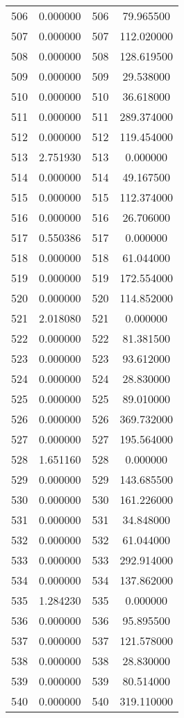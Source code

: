 \documentclass[12pt]{article}
\begin{document}
\begin{longtable}{@{}cccc@{}}
506 & 0.000000 & 506 & 79.965500 \\
507 & 0.000000 & 507 & 112.020000 \\
508 & 0.000000 & 508 & 128.619500 \\
509 & 0.000000 & 509 & 29.538000 \\
510 & 0.000000 & 510 & 36.618000 \\
511 & 0.000000 & 511 & 289.374000 \\
512 & 0.000000 & 512 & 119.454000 \\
513 & 2.751930 & 513 & 0.000000 \\
514 & 0.000000 & 514 & 49.167500 \\
515 & 0.000000 & 515 & 112.374000 \\
516 & 0.000000 & 516 & 26.706000 \\
517 & 0.550386 & 517 & 0.000000 \\
518 & 0.000000 & 518 & 61.044000 \\
519 & 0.000000 & 519 & 172.554000 \\
520 & 0.000000 & 520 & 114.852000 \\
521 & 2.018080 & 521 & 0.000000 \\
522 & 0.000000 & 522 & 81.381500 \\
523 & 0.000000 & 523 & 93.612000 \\
524 & 0.000000 & 524 & 28.830000 \\
525 & 0.000000 & 525 & 89.010000 \\
526 & 0.000000 & 526 & 369.732000 \\
527 & 0.000000 & 527 & 195.564000 \\
528 & 1.651160 & 528 & 0.000000 \\
529 & 0.000000 & 529 & 143.685500 \\
530 & 0.000000 & 530 & 161.226000 \\
531 & 0.000000 & 531 & 34.848000 \\
532 & 0.000000 & 532 & 61.044000 \\
533 & 0.000000 & 533 & 292.914000 \\
534 & 0.000000 & 534 & 137.862000 \\
535 & 1.284230 & 535 & 0.000000 \\
536 & 0.000000 & 536 & 95.895500 \\
537 & 0.000000 & 537 & 121.578000 \\
538 & 0.000000 & 538 & 28.830000 \\
539 & 0.000000 & 539 & 80.514000 \\
540 & 0.000000 & 540 & 319.110000 \\

\end{longtable}
\end{document}
